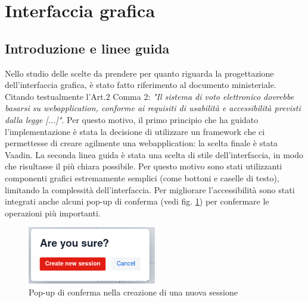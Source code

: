 \section{Interfaccia grafica}\label{gui}

\subsection{Introduzione e linee guida}
Nello studio delle scelte da prendere per quanto riguarda la progettazione dell'interfaccia grafica, è stato fatto riferimento al documento ministeriale. Citando testualmente l'Art.2 Comma 2: \emph{"Il sistema di voto elettronico dovrebbe basarsi su webapplication, conforme ai requisiti di usabilità e accessibilità previsti dalla legge [...]"}. 
Per questo motivo, il primo principio che ha guidato l'implementazione è stata la decisione di utilizzare un framework che ci permettesse di creare agilmente una webapplication: la scelta finale è stata Vaadin.
La seconda linea guida è stata una scelta di stile dell'interfaccia, in modo che risultasse il più chiara possibile. Per questo motivo sono stati utilizzanti componenti grafici estremamente semplici (come bottoni e caselle di testo), limitando la complessità dell'interfaccia.
Per migliorare l'accessibilità sono stati integrati anche alcuni pop-up di conferma (vedi fig. \ref{screeenshot:newsessionconfirm}) per confermare le operazioni più importanti.
\begin{figure}
	\centering
	\includegraphics[width=0.5\textwidth]{img/gui/newSessionConfirm.png}
	\caption{Pop-up di conferma nella creazione di una nuova sessione}
	\label{screeenshot:newsessionconfirm}
\end{figure}

